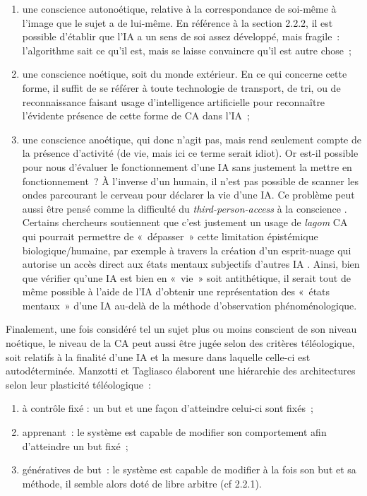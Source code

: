 \documentclass[a4paper, titlepage, 12pt]{article}
\begin{document}
	\begin{enumerate}
		\item une conscience autonoétique, relative à la correspondance de soi-même à l’image que le sujet a de lui-même. En référence à la section 2.2.2, il est possible d’établir que l’IA a un sens de soi assez développé, mais fragile~: l’algorithme sait ce qu’il est, mais se laisse convaincre qu’il est autre chose~;
		\item une conscience noétique, soit du monde extérieur. En ce qui concerne cette forme, il suffit de se référer à toute technologie de transport, de tri, ou de reconnaissance faisant usage d'intelligence artificielle pour reconnaître l’évidente présence de cette forme de CA dans l’IA~;
		\item une conscience anoétique, qui donc n’agit pas, mais rend seulement compte de la présence d’activité (de vie, mais ici ce terme serait idiot). Or est-il possible pour nous d’évaluer le fonctionnement d’une IA sans justement la mettre en fonctionnement~? À l’inverse d’un humain, il n’est pas possible de scanner les ondes parcourant le cerveau pour déclarer la vie d’une IA. Ce problème peut aussi être pensé comme la difficulté du \textit{third-person-access} à la conscience \cite{eversArtificialConsciousnessLogical2024}. Certains chercheurs soutiennent que c’est justement un usage de \textit{lagom} CA qui pourrait permettre de «~dépasser~»  cette limitation épistémique biologique/humaine, par exemple à travers la création d’un esprit-nuage qui autorise un accès direct aux états mentaux subjectifs d’autres IA \cite{lyreskogMergingMindsConceptual2023}. Ainsi, bien que vérifier qu’une IA est bien en «~vie~» soit antithétique, il serait tout de même possible à l’aide de l’IA d’obtenir une représentation des «~états mentaux~» d’une IA au-delà de la méthode d’observation phénoménologique.
	\end{enumerate}

	Finalement, une fois considéré tel un sujet plus ou moins conscient de son niveau noétique, le niveau de la CA peut aussi être jugée selon des critères téléologique, soit relatifs à la finalité d’une IA et la mesure dans laquelle celle-ci est autodéterminée. Manzotti et Tagliasco élaborent une hiérarchie des architectures selon leur plasticité téléologique~:
	\begin{enumerate}
		\item à contrôle fixé : un but et une façon d’atteindre celui-ci sont fixés~;
		\item apprenant~: le système est capable de modifier son comportement afin d’atteindre un but fixé~;
		\item génératives de but~: le système est capable de modifier à la fois son but et sa méthode, il semble alors doté de libre arbitre (cf 2.2.1).
	\end{enumerate}
\end{document}
